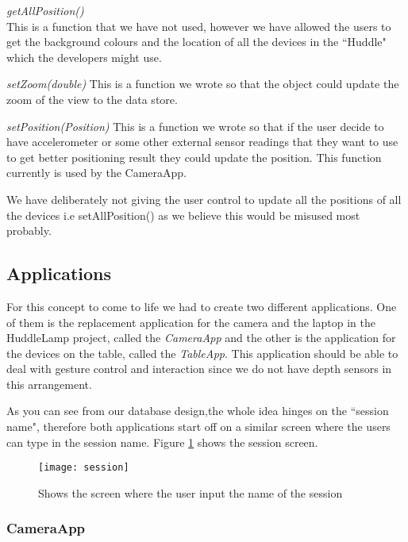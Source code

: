 \emph{getAllPosition()}\\
This is a function that we have not used, however we have allowed the users to get the background colours and the location of all the devices in the ``Huddle" which the developers might use.

\emph{setZoom(double)}
This is a function we wrote so that the object could update the zoom of the view to the data store.

\emph{setPosition(Position)}
This is a function we wrote so that if the user decide to have accelerometer or some other external sensor readings that they want to use to get better positioning result they could update the position. This function currently is used by the CameraApp.

We have deliberately not giving the user control to update all the positions of all the devices i.e setAllPosition() as we believe this would be misused most probably.



\subsection{Applications}
For this concept to come to life we had to create two different applications. One of them is the replacement application for the camera and the laptop in the HuddleLamp project, called the \emph{CameraApp} and the other is the application for the devices on the table, called the \emph{TableApp}. This application should be able to deal with gesture control and interaction since we do not have depth sensors in this arrangement.

As you can see from our database design,the whole idea hinges on the ``session name", therefore both applications start off on a similar screen where the users can type in the session name. Figure \ref{session_screen} shows the session screen. 
\begin{figure}
\centering
\texttt{[image: session]}
\caption{Shows the screen where the user input the name of the session}
\label{session_screen}
\end{figure}
\subsubsection{CameraApp} \label{cameraapp}

